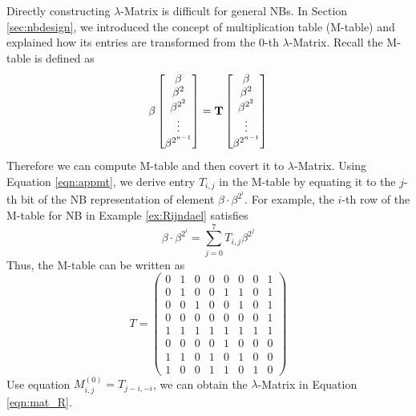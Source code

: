 Directly constructing $\lambda$-Matrix is difficult for general NBs. 
In Section \ref{sec:nbdesign}, we introduced the concept of multiplication table (M-table) and explained how its 
entries are transformed from the $0$-th $\lambda$-Matrix. 
Recall the M-table is defined as
\begin{equation}
\label{eqn:appmt}
\beta
\begin{bmatrix}
\beta \\ \beta^2 \\ \beta^{2^2} \\ \vdots \\ \beta^{2^{n-1}}
\end{bmatrix}
= {\bf T}
\begin{bmatrix}
\beta \\ \beta^2 \\ \beta^{2^2} \\ \vdots \\ \beta^{2^{n-1}}
\end{bmatrix}
\end{equation}
Therefore we can compute M-table and then covert it to $\lambda$-Matrix.
Using Equation \ref{eqn:appmt}, we derive entry $T_{i,j}$ in the M-table by equating it to
the $j$-th bit of the NB representation of element $\beta\cdot\beta^{2^{i}}$.
For example, the $i$-th row of the M-table for NB in Example \ref{ex:Rijndael} satisfies
$$\beta\cdot\beta^{2^i} = \sum_{j=0}^{7} T_{i,j}\beta^{2^j}$$
Thus, the M-table can be written as
\begin{equation*}
T = \left(\begin{array}{lccccccr}
0 &1 &0 &0 &0 &0 &0 &1 \\
0 &1 &0 &0 &1 &1 &0 &1 \\
0 &0 &1 &0 &0 &1 &0 &1 \\
0 &0 &0 &0 &0 &0 &0 &1 \\
1 &1 &1 &1 &1 &1 &1 &1 \\
0 &0 &0 &0 &1 &0 &0 &0 \\
1 &1 &0 &1 &0 &1 &0 &0 \\
1 &0 &0 &1 &1 &0 &1 &0
\end{array}\right)
\end{equation*}
Use equation $M_{i,j}^{(0)} = T_{j-i,-i}$, we can obtain the
$\lambda$-Matrix in Equation \ref{eqn:mat_R}.



